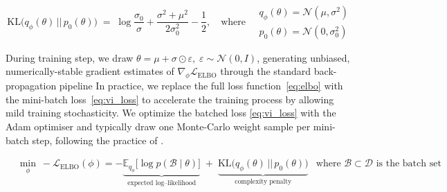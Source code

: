 \documentclass[preprint,12pt]{elsarticle}
\begin{document}
\begin{equation}
  \mathrm{KL}
  \bigl(
    q_{\phi}(\theta)\,||\,p_{0}(\theta)
  \bigr)
  \;=\;
  \log\frac{\sigma_{0}}{\sigma}
  +\frac{\sigma^{2}+\mu^{2}}{2\sigma_{0}^{2}}
  -\frac12, \quad \text{where} \quad
  \begin{aligned}
    q_{\phi}(\theta) = \mathcal{N}(\mu, \sigma^2)\\
    p_{0}(\theta) = \mathcal{N}(0, \sigma_0^2)
  \end{aligned}
  \label{eq:kl_gaussians}
\end{equation}

During training step, we draw
\(
\theta=\mu+\sigma\odot\varepsilon,\;
\varepsilon\sim\mathcal N(0,I)
\),
generating unbiased, numerically-stable gradient estimates of
$\nabla_{\!\phi}\mathcal L_{\mathrm{ELBO}}$ through the standard
back-propagation pipeline %
In practice, we replace the full loss function~\eqref{eq:elbo} with the mini-batch loss~\eqref{eq:vi_loss} to accelerate the training process by allowing mild training stochasticity. We optimize the batched loss \eqref{eq:vi_loss} with the Adam optimiser and typically
draw one Monte-Carlo weight sample per mini-batch step, following the
practice of \cite{yang_b-pinns_2021}.




\begin{align}
  &\min_{\phi}\ - \mathcal L_{\mathrm{ELBO}}(\phi) 
  = -
     \underbrace{\mathbb E_{q_{\phi}}
       \!\bigl[\log p(\mathcal B\mid\theta)\bigr]}_{\text{expected log–likelihood}}
     \;+\;
     \underbrace{\mathrm{KL}\!\bigl(q_{\phi}(\theta)\,||\,p_{0}(\theta)\bigr)}_{\text{complexity penalty}}
    &\text{where }
    \mathcal B \subset \mathcal D
    \text{ is the batch set}
  \label{eq:elbo}
\end{align}
\end{document}

